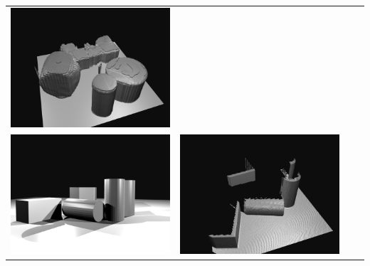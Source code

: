 \begin{tabular}{cccc}
\includegraphics[height=\turnheight]{umk4nke6pzebef2b_SEQ_pred_voxlets.png} \\
\includegraphics[height=\turnheight]{xf2hcoes8lp9fb1t_SEQ_input.png} &
\includegraphics[height=\turnheight]{xf2hcoes8lp9fb1t_SEQ_visible.png} &

\end{tabular}
